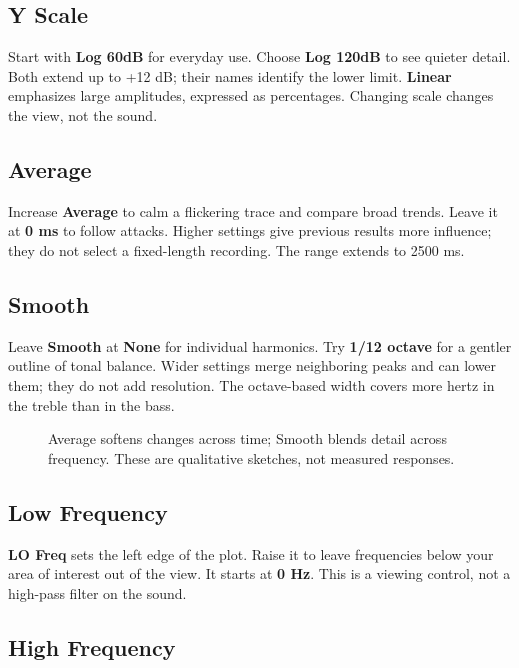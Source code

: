 \subsection{Y Scale}

Start with \textbf{Log 60dB} for everyday use. Choose \textbf{Log 120dB}
to see quieter detail. Both extend up to +12 dB; their names identify the
lower limit. \textbf{Linear} emphasizes large amplitudes, expressed as
percentages. Changing scale changes the view, not the sound.

\subsection{Average}

Increase \textbf{Average} to calm a flickering trace and compare broad trends.
Leave it at \textbf{0 ms} to follow attacks. Higher settings give previous
results more influence; they do not select a fixed-length recording. The
range extends to 2500 ms.

\subsection{Smooth}

Leave \textbf{Smooth} at \textbf{None} for individual harmonics. Try
\textbf{1/12 octave} for a gentler outline of tonal balance. Wider settings
merge neighboring peaks and can lower them; they do not add resolution.
The octave-based width covers more hertz in the treble than in the bass.

\begin{figure}[!htp]
\centering

\caption{Average softens changes across time; Smooth blends detail across
frequency. These are qualitative sketches, not measured responses.}
\end{figure}

\clearpage
\subsection{Low Frequency}

\textbf{LO Freq} sets the left edge of the plot. Raise it to leave frequencies
below your area of interest out of the view. It starts at \textbf{0 Hz}.
This is a viewing control, not a high-pass filter on the sound.

\subsection{High Frequency}

